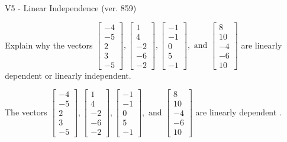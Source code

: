 \begin{exercise}
  \begin{exerciseTitle}V5 - Linear Independence (ver. 859)\end{exerciseTitle}
  \begin{exerciseStatement}
    Explain why the vectors \(\left[\begin{array}{r}
-4 \\
-5 \\
2 \\
3 \\
-5
\end{array}\right] , \left[\begin{array}{r}
1 \\
4 \\
-2 \\
-6 \\
-2
\end{array}\right] , \left[\begin{array}{r}
-1 \\
-1 \\
0 \\
5 \\
-1
\end{array}\right] , \text{ and } \left[\begin{array}{r}
8 \\
10 \\
-4 \\
-6 \\
10
\end{array}\right]\) are linearly dependent or linearly independent.	


  \end{exerciseStatement}
  \begin{exerciseAnswer}
   The vectors \(\left[\begin{array}{r}
-4 \\
-5 \\
2 \\
3 \\
-5
\end{array}\right] , \left[\begin{array}{r}
1 \\
4 \\
-2 \\
-6 \\
-2
\end{array}\right] , \left[\begin{array}{r}
-1 \\
-1 \\
0 \\
5 \\
-1
\end{array}\right] , \text{ and } \left[\begin{array}{r}
8 \\
10 \\
-4 \\
-6 \\
10
\end{array}\right]\) are 
  	 linearly dependent  .
  


  \end{exerciseAnswer}
\end{exercise}